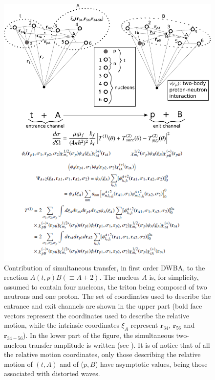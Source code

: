\begin{figure}
\centerline{\includegraphics*[width=\textwidth,angle=0]{nutshell/figs/fig_alpha.pdf}}
\caption{Contribution of simultaneous transfer, in first order DWBA, to the reaction $A(t,p)B(\equiv A+2)$. The nucleus $A$ is, for simplicity, assumed to contain four nucleons, the triton being composed of two neutrons and one proton. The set of coordinates used to describe the entrance and exit channels are shown in the upper part (bold face vectors represent the coordinates used to describe the relative motion, while the intrinsic coordinates $\xi_A$ represent $\mathbf r_{34}$, $\mathbf r_{56}$ and $\mathbf r_{34-56}$). In the lower part of the figure, the simultaneous two-nucleon transfer amplitude is written (see \cite{Potel:13b}). It is of notice that of all the relative motion coordinates, only those describing the relative motion of $(t,A)$ and of ($p,B$) have asymptotic values, being those associated with distorted waves.}\label{fig_alpha}
\end{figure}
